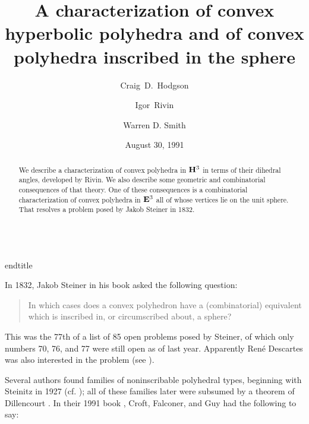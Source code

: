 \def\currentvolume{27}
\def\currentissue{2}
\def\currentyear{1992}
\def\currentmonth{October}
\def\copyrightyear{1992}
\def\currentpages{246-251}
\title[Convex hyperbolic and convex polyhedra in the 
sphere]{A 
characterization of convex hyperbolic polyhedra and of
convex polyhedra inscribed in the sphere}\\endtitle
\author[C. D. Hodgson]{Craig~D.~Hodgson}
\address{Mathematics Department, University of
Melbourne, Parkville, Victoria, Australia}
\author{Igor~Rivin}
\address{NEC Research Institute, Princeton, New Jersey 08540
and Mathematics Department, Princeton University,
Princeton, New Jersey 08540}
\author[W. D. Smith]{Warren D. Smith}
\address{NEC Research Institute, Princeton, New Jersey 
08540}
\date{August 30, 1991}
\maketitle

\begin{abstract}
We describe a characterization of convex polyhedra
in $\bold{H}^3$ in
terms of their dihedral angles, developed by Rivin. We 
also describe
some geometric and combinatorial consequences of that 
theory. One of
these consequences is a combinatorial characterization of 
convex
polyhedra in $\bold{E}^3$ 
all of whose vertices lie on the unit sphere. That 
resolves a
problem posed by Jakob Steiner in 1832.
\end{abstract}

In 1832, Jakob Steiner in his book \cite{st:geom}
asked the following question:

\begin{quote}
In which cases does a convex polyhedron have a 
(combinatorial)
equivalent which is inscribed in, or circumscribed about, 
a sphere?
\end{quote}

This was the 77th of a list of 85 open problems posed by 
Steiner,
of which only numbers 70, 76, and 77 
were still open as of last year.
Apparently Ren\'e Descartes was also interested
in the problem (see \cite{de:solid}). 

Several authors found families of
noninscribable polyhedral types, beginning with Steinitz 
in 1927
(cf. \cite{gru:conp}); all of these families later were 
subsumed by a
theorem of Dillencourt \cite{Dill90b}. In their 1991 book
\cite[problem B18]{CFG}, Croft, Falconer, and Guy
had the following to say:

